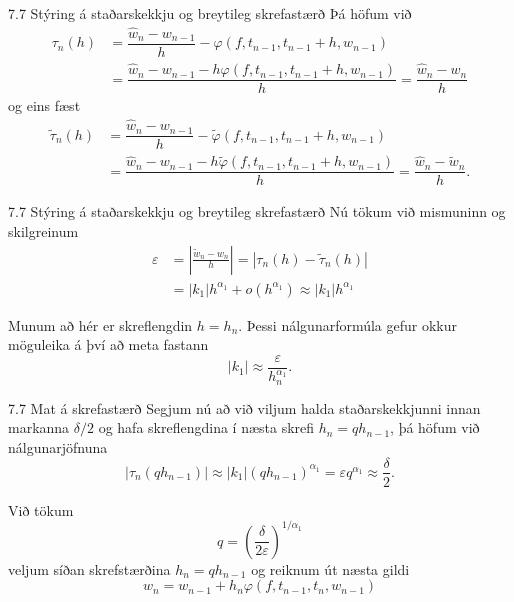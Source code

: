 \begin{frame}{7.7 Stýring á staðarskekkju og breytileg skrefastærð} 
Þá höfum við 
\begin{align*}
 \tau_n(h)&=\dfrac{\hat
w_{n}-w_{n-1}}{h}-\varphi(f,t_{n-1},t_{n-1}+h,w_{n-1})\\
&=\dfrac{\hat
w_{n}-w_{n-1}-h\varphi(f,t_{n-1},t_{n-1}+h,w_{n-1})}{h} 
=\dfrac {\hat w_{n}-w_{n}}{h}
\end{align*}
og eins fæst
\begin{align*}
\tilde \tau_n(h)
&=\dfrac{\hat
w_{n}-w_{n-1}}{h}-\tilde \varphi(f,t_{n-1},t_{n-1}+h,w_{n-1})\\
&=\dfrac{\hat
w_{n}-w_{n-1}-h\tilde \varphi(f,t_{n-1},t_{n-1}+h,w_{n-1})}{h} 
=\dfrac {\hat w_{n}-\tilde w_{n}}{h}. 
\end{align*}
\end{frame}


\begin{frame}{7.7  Stýring á staðarskekkju og breytileg skrefastærð} 
Nú tökum við mismuninn og skilgreinum
\begin{align*}
\varepsilon 
&= \left|\frac{\tilde w_{n}-w_{n}}{h}\right|=|\tau_n(h)-\tilde
  \tau_n(h)|\\
&=|k_1|h^{\alpha_1}+o(h^{\alpha_1}) \approx |k_1|h^{\alpha_1}  
\end{align*}

\pause
Munum að hér er skreflengdin $h=h_{n}$.  
Þessi nálgunarformúla gefur
okkur möguleika á því að meta fastann 
$$|k_1|\approx
\dfrac\varepsilon{h_{n}^{\alpha_1}}.
$$
\end{frame}


\begin{frame}{7.7 Mat á skrefastærð} 
Segjum nú að við viljum halda
staðarskekkjunni innan markanna $\delta/2$ og hafa skreflengdina í
næsta skrefi $h_{n}=qh_{n-1}$, þá höfum við nálgunarjöfnuna
  $$ |\tau_n(qh_{n-1})|\approx |k_1|(qh_{n-1})^{\alpha_1}=
\varepsilon {q^{\alpha_1}} \approx  \frac{\delta} 2. $$

\pause
\smallskip
Við tökum 
  $$ q = \left(\frac{\delta}{2\varepsilon}\right)^{1/{\alpha_1}} $$
veljum síðan skrefstærðina $h_n = qh_{n-1}$ og reiknum út næsta gildi
$$ 
w_{n} = w_{n-1} + h_n\varphi(f,t_{n-1},t_n,w_{n-1}) 
$$
\end{frame}

